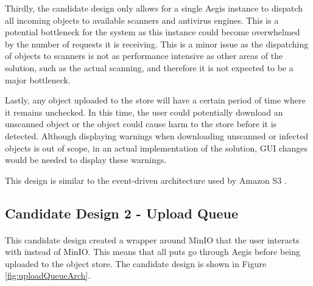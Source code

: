 \documentclass[12pt, conference, final, a4paper, onecolumn, compsoc]{IEEEtran}
\begin{document}
Thirdly, the candidate design only allows for a single Aegis instance to
dispatch all incoming objects to available scanners and antivirus engines. This
is a potential bottleneck for the system as this instance could become
overwhelmed by the number of requests it is receiving. This is a minor issue as
the dispatching of objects to scanners is not as performance intensive as other
areas of the solution, such as the actual scanning, and therefore it is not
expected to be a major bottleneck.

Lastly, any object uploaded to the store will have a certain period of time
where it remains unchecked. In this time, the user could potentially download an
unscanned object or the object could cause harm to the store before it is
detected. Although displaying warnings when downloading unscanned or infected objects is out
of scope, in an actual implementation of the solution, GUI changes would be
needed to display these warnings.

This design is similar to the event-driven architecture used by Amazon S3 \citep{amazon-md}.

\subsection{Candidate Design 2 - Upload Queue}
\paragraph{}

This candidate design created a wrapper around MinIO that the user interacts
with instead of MinIO. This means that all puts go through Aegis before being
uploaded to the object store. The candidate design is shown in Figure
\ref{fig:uploadQueueArch}.

\pagebreak
\end{document}
